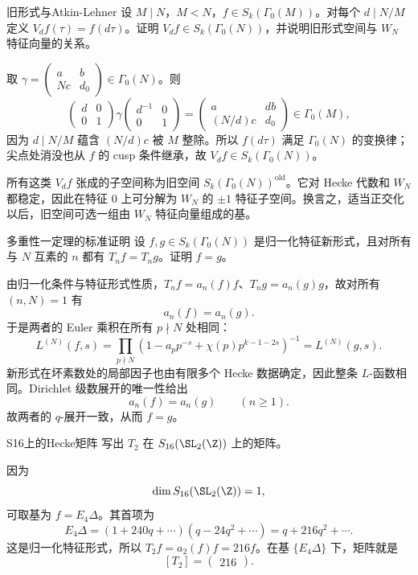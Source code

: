 \begin{problem}{旧形式与Atkin-Lehner}
设 $M\mid N$，$M<N$，$f\in S_k(\Gamma_0(M))$。对每个 $d\mid N/M$ 定义 $V_df(\tau)=f(d\tau)$。证明 $V_df\in S_k(\Gamma_0(N))$，并说明旧形式空间与 $W_N$ 特征向量的关系。
\end{problem}
\begin{solution}
取 $\gamma=\begin{pmatrix}a&b\\Nc&d_0\end{pmatrix}\in\Gamma_0(N)$。则
\[
\begin{pmatrix}d&0\\0&1\end{pmatrix}
\gamma
\begin{pmatrix}d^{-1}&0\\0&1\end{pmatrix}
=
\begin{pmatrix}a&db\\(N/d)c&d_0\end{pmatrix}\in\Gamma_0(M),
\]
因为 $d\mid N/M$ 蕴含 $(N/d)c$ 被 $M$ 整除。所以 $f(d\tau)$ 满足 $\Gamma_0(N)$ 的变换律；尖点处消没也从 $f$ 的 cusp 条件继承，故 $V_df\in S_k(\Gamma_0(N))$。

所有这类 $V_df$ 张成的子空间称为旧空间 $S_k(\Gamma_0(N))^{\mathrm{old}}$。它对 Hecke 代数和 $W_N$ 都稳定，因此在特征 $0$ 上可分解为 $W_N$ 的 $\pm1$ 特征子空间。换言之，适当正交化以后，旧空间可选一组由 $W_N$ 特征向量组成的基。
\end{solution}

\begin{problem}{多重性一定理的标准证明}
设 $f,g\in S_k(\Gamma_0(N))$ 是归一化特征新形式，且对所有与 $N$ 互素的 $n$ 都有 $T_nf=T_ng$。证明 $f=g$。
\end{problem}
\begin{solution}
由归一化条件与特征形式性质，$T_nf=a_n(f)f$、$T_ng=a_n(g)g$，故对所有 $(n,N)=1$ 有
\[
a_n(f)=a_n(g).
\]
于是两者的 Euler 乘积在所有 $p\nmid N$ 处相同：
\[
L^{(N)}(f,s)=\prod_{p\nmid N}(1-a_pp^{-s}+\chi(p)p^{k-1-2s})^{-1}=L^{(N)}(g,s).
\]
新形式在坏素数处的局部因子也由有限多个 Hecke 数据确定，因此整条 $L$-函数相同。Dirichlet 级数展开的唯一性给出
\[
a_n(f)=a_n(g)\qquad (n\ge1).
\]
故两者的 $q$-展开一致，从而 $f=g$。
\end{solution}

\begin{problem}{S16上的Hecke矩阵}
写出 $T_2$ 在 $S_{16}(\SL_2(\Z))$ 上的矩阵。
\end{problem}
\begin{solution}
因为
\[
\dim S_{16}(\SL_2(\Z))=1,
\]
可取基为 $f=E_4\Delta$。其首项为
\[
E_4\Delta=(1+240q+\cdots)(q-24q^2+\cdots)=q+216q^2+\cdots.
\]
这是归一化特征形式，所以 $T_2f=a_2(f)f=216f$。在基 $\{E_4\Delta\}$ 下，矩阵就是
\[
[T_2]=\begin{pmatrix}216\end{pmatrix}.
\]
\end{solution}

